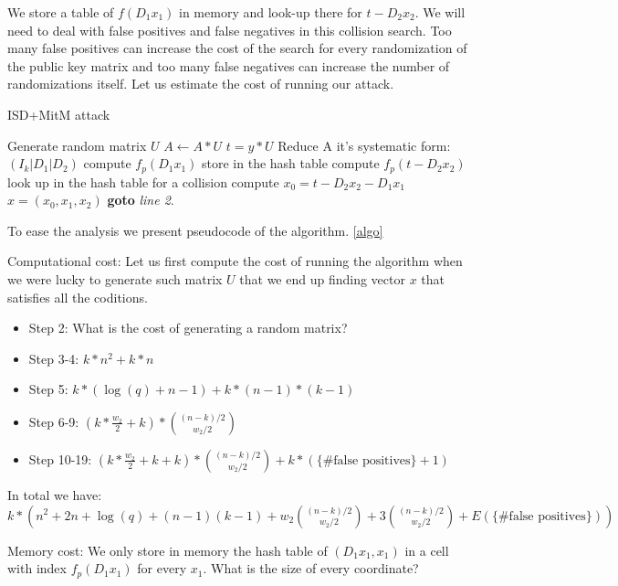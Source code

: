 \documentclass[12pt]{article}
\begin{document}
We store a table of $f(D_1x_1)$ in memory and look-up there for $t - D_2x_2$. We will need to deal with false positives and false negatives in this collision search. Too many false positives can increase the cost of the search for every randomization of the public key matrix and too many false negatives can increase the number of randomizations itself. Let us estimate the cost of running our attack.
\begin{algorithm}
\caption{ISD+MitM attack}\label{algo}
\begin{algorithmic}[1]
    \State Generate random matrix $U$
    \State $A \gets A * U$
    \State $t = y * U$
    \State Reduce A it's systematic form: $(I_k |D_1|D_2)$
    \State compute $f_{p}(D_1x_1)$
    \State store in the hash table
    \EndFor
    \State compute $f_{p}(t - D_2x_2)$
    \State look up in the hash table for a collision
        \State compute $x_0 = t - D_2x_2 - D_1x_1$
        \State \Return $x = (x_0, x_1, x_2)$
        \EndIf
    \EndIf
    \EndFor
\State \textbf{goto} \emph{line 2}.
\EndProcedure
\end{algorithmic}
\end{algorithm}
To ease the analysis we present pseudocode of the algorithm. \ref{algo}

Computational cost:
Let us first compute the cost of running the algorithm when we were lucky to generate such matrix $U$ that we end up finding vector $x$ that satisfies all the coditions.
\begin{itemize}
    \item Step 2: What is the cost of generating a random matrix?
    \item Step 3-4: $k*n^2 + k*n$
    \item Step 5: $k*(\log(q) + n-1) + k*(n-1)*(k-1)$
    \item Step 6-9: $(k*\frac{w_2}{2} + k)*\binom{(n-k)/2}{w_2/2}$
    \item Step 10-19: $(k*\frac{w_2}{2} + k + k)*\binom{(n-k)/2}{w_2/2} + k*(\{\text{\# false positives}\} + 1)$
\end{itemize}
In total we have: $k*(n^2 + 2n + \log(q) + (n-1)(k-1) + w_2\binom{(n-k)/2}{w_2/2} + 3\binom{(n-k)/2}{w_2/2} + E(\{\text{\# false positives}\}))$

Memory cost:
We only store in memory the hash table of $(D_1x_1, x_1)$ in a cell with index $f_{p}(D_1x_1)$ for every $x_1$.
What is the size of every coordinate?
\end{document}
